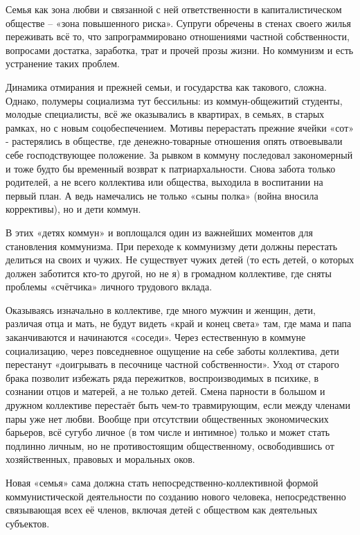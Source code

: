 \documentclass[12pt,a4paper,openany]{book}
\begin{document}
Семья как зона любви и связанной с ней ответственности в капиталистическом обществе – «зона повышенного риска». Супруги обречены в стенах своего жилья переживать всё то, что запрограммировано отношениями частной собственности, вопросами достатка, заработка, трат и прочей прозы жизни. Но коммунизм и есть устранение таких проблем.

Динамика отмирания и прежней семьи, и государства как такового, сложна. Однако, полумеры социализма тут бессильны: из коммун-общежитий студенты, молодые специалисты, всё же оказывались в квартирах, в семьях, в старых рамках, но с новым соцобеспечением. Мотивы перерастать прежние ячейки «сот» - растерялись в обществе, где денежно-товарные отношения опять отвоевывали себе господствующее положение. За рывком в коммуну последовал закономерный и тоже будто бы временный возврат к патриархальности. Снова забота только родителей, а не всего коллектива или общества, выходила в воспитании на первый план. А ведь намечались не только «сыны полка» (война вносила коррективы), но и дети коммун.

В этих «детях коммун» и воплощался один из важнейших моментов для становления коммунизма. При переходе к коммунизму дети должны перестать делиться на своих и чужих. Не существует чужих детей (то есть детей, о которых должен заботится кто-то другой, но не я) в громадном коллективе, где сняты проблемы «счётчика» личного трудового вклада.

Оказываясь изначально в коллективе, где много мужчин и женщин, дети, различая отца и мать, не будут видеть «край и конец света» там, где мама и папа заканчиваются и начинаются «соседи». Через естественную в коммуне социализацию, через повседневное ощущение на себе заботы коллектива, дети перестанут «доигрывать в песочнице частной собственности». Уход от старого брака позволит избежать ряда пережитков, воспроизводимых в психике, в сознании отцов и матерей, а не только детей. Смена парности в большом и дружном коллективе перестаёт быть чем-то травмирующим, если между членами пары уже нет любви. Вообще при отсутствии общественных экономических барьеров, всё сугубо личное (в том числе и интимное) только и может стать подлинно личным, но не противостоящим общественному, освободившись от хозяйственных, правовых и моральных оков.

Новая «семья» сама должна стать непосредственно-коллективной формой коммунистической деятельности по созданию нового человека, непосредственно связывающая всех её членов, включая детей с обществом как деятельных субъектов.
\ifSubfilesClassLoaded{\setcounter{page}{54}}{}
\end{document}
